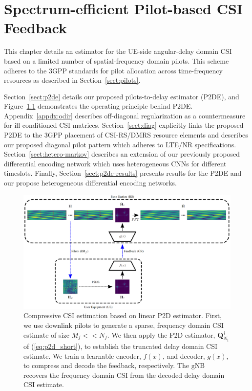 \chapter{Spectrum-efficient Pilot-based CSI Feedback}
\label{chap:p2d}

This chapter details an estimator for the UE-side angular-delay domain CSI based on a limited number of spatial-frequency domain pilots. This scheme adheres to the 3GPP standards for pilot allocation across time-frequency resources as described in Section~\ref{sect:pilots}.

Section~\ref{sect:p2de} details our proposed pilots-to-delay estimator (P2DE), and Figure~\ref{fig:p2d} demonstrates the operating principle behind P2DE. Appendix~\ref{appdx:odir} describes off-diagonal regularization as a countermeasure for ill-conditioned CSI matrices. Section~\ref{sect:diag} explicitly links the proposed P2DE to the 3GPP placement of CSI-RS/DMRS resource elements and describes our proposed diagonal pilot pattern which adheres to LTE/NR specifications. Section~\ref{sect:hetero-markov} describes an extension of our previously proposed differential encoding network which uses heterogeneous CNNs for different timeslots. Finally, Section~\ref{sect:p2de-results} presents results for the P2DE and our propose heterogeneous differential encoding networks.

\begin{figure}[!hbtp]
    \centering
    \includegraphics[width=\linewidth]{./images/00_downlink_p2d_feedback_horiz_diag.png}
    \caption{Compressive CSI estimation based on linear P2D estimator. First,
    we use downlink pilots to 
    generate a sparse, frequency domain CSI
    estimate 
    of size $M_f << N_f$. We then apply
    the P2D estimator, $\mathbf{Q}^\dag_{N_t}$ of (\ref{eq:p2d_short}), to establish 
    the truncated
    delay domain CSI estimate.
    We train a
    learnable encoder, 
    $f(x)$,
    and decoder, $g(x)$, to compress and decode the feedback, respectively. The 
    gNB recovers
    the frequency domain
    CSI from 
    the decoded 
    delay domain CSI estimate.}
    \label{fig:p2d}
\end{figure}

